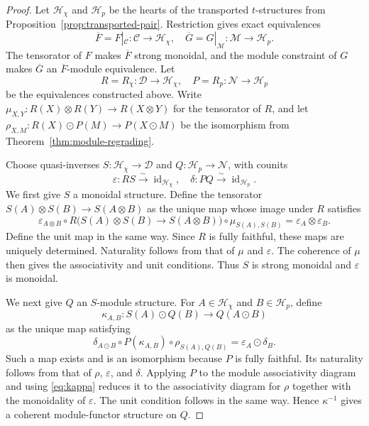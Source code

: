 \documentclass[11pt]{amsart}
\newcommand{\C}{\mathcal C}
\newcommand{\D}{\mathcal D}
\newcommand{\M}{\mathcal M}
\newcommand{\N}{\mathcal N}
\newcommand{\Hh}{\mathcal H}
\DeclareMathOperator{\id}{id}
\theoremstyle{definition}
\theoremstyle{remark}
\theoremstyle{plain}
\begin{document}
\begin{proof}
Let $\Hh_\chi$ and $\Hh_p$ be the hearts of the transported $t$-structures from Proposition~\ref{prop:transported-pair}. Restriction gives exact equivalences
\begin{equation*}
\overline F=F|_{\C}:\C\rightarrow\Hh_\chi,\quad \overline G=G|_{\M}:\M\rightarrow\Hh_p.
\end{equation*}
The tensorator of $F$ makes $\overline F$ strong monoidal, and the module constraint of $G$ makes $\overline G$ an $\overline F$-module equivalence. Let
\begin{equation*}
R=R_\chi:\D\rightarrow\Hh_\chi,\quad P=R_p:\N\rightarrow\Hh_p
\end{equation*}
be the equivalences constructed above. Write $\mu_{X,Y}: R(X)\otimes R(Y)\to R(X\otimes Y)$ for the tensorator of $R$, and let $\rho_{X,M}: R(X)\odot P(M)\to P(X\odot M)$ be the isomorphism from Theorem~\ref{thm:module-regrading}.

Choose quasi-inverses $S:\Hh_\chi\to\D$ and $Q:\Hh_p\to\N$, with counits
\begin{equation*}
\varepsilon: RS\xrightarrow{\sim}\id_{\Hh_\chi},\quad
\delta: PQ\xrightarrow{\sim}\id_{\Hh_p}.
\end{equation*}
We first give $S$ a monoidal structure. Define the tensorator $S(A)\otimes S(B)\to S(A\otimes B)$ as the unique map whose image under $R$ satisfies
\begin{equation}\label{eq:S-tensorator}
\varepsilon_{A\otimes B}\circ R\bigl(S(A)\otimes S(B)\to S(A\otimes B)\bigr)\circ\mu_{S(A),S(B)}
=\varepsilon_A\otimes\varepsilon_B.
\end{equation}
Define the unit map in the same way. Since $R$ is fully faithful, these maps are uniquely determined. Naturality follows from that of $\mu$ and $\varepsilon$. The coherence of $\mu$ then gives the associativity and unit conditions. Thus $S$ is strong monoidal and $\varepsilon$ is monoidal.

We next give $Q$ an $S$-module structure. For $A\in\Hh_\chi$ and $B\in\Hh_p$, define
\begin{equation*}
\kappa_{A,B}: S(A)\odot Q(B)\rightarrow Q(A\odot B)
\end{equation*}
as the unique map satisfying
\begin{equation}\label{eq:kappa}
\delta_{A\odot B}\circ P(\kappa_{A,B})\circ\rho_{S(A),Q(B)}
=\varepsilon_A\odot\delta_B.
\end{equation}
Such a map exists and is an isomorphism because $P$ is fully faithful. Its naturality follows from that of $\rho$, $\varepsilon$, and $\delta$. Applying $P$ to the module associativity diagram and using \eqref{eq:kappa} reduces it to the associativity diagram for $\rho$ together with the monoidality of $\varepsilon$. The unit condition follows in the same way. Hence $\kappa^{-1}$ gives a coherent module-functor structure on $Q$.


\end{proof}
\end{document}
